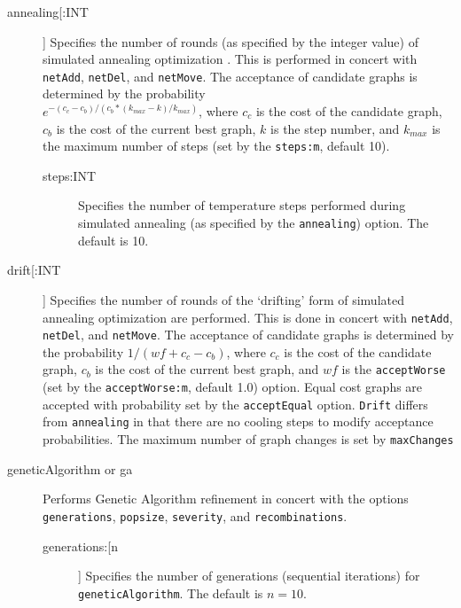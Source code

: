 	\begin{description}
		\item[annealing[:INT]] Specifies the number of rounds (as specified by the integer 
		value) of simulated annealing optimization \citep{Metropolisetal1953, 
		Kirkpatricketal1983, Cerny1985}. This is performed in concert with \texttt{netAdd}, 
		\texttt{netDel}, and \texttt{netMove}. The acceptance of candidate graphs is 
		determined by the probability\\ $e ^ {- (c_c - c_b)/ (c_b * (k_{max} -k)/ k_{max})}$, 
		where $c_c$ is the cost of the candidate graph, $c_b$ is the cost of the current 
		best graph, $k$ is the step number, and $k_{max}$ is the maximum number of 
		steps (set by the \texttt{steps:m}, default 10).

		\begin{description}
			\item[steps:INT] Specifies the number of temperature steps performed 
			during simulated annealing (as specified by the \texttt{annealing}) option.
			The default is 10.
		\end{description}
			
		\item[drift[:INT]] Specifies the number of rounds of the `drifting' form of simulated 
		annealing optimization \citep{goloboff1999} are performed. This is done in concert 
		with \texttt{netAdd}, \texttt{netDel}, and \texttt{netMove}. The acceptance of candidate 
		graphs is determined by the probability $1/ (wf + c_c - c_b)$, where $c_c$ is the cost 
		of the candidate graph, $c_b$ is the cost of the current best graph, and $wf$ is the 
		\texttt{acceptWorse} (set by the \texttt{acceptWorse:m}, default 1.0) option. Equal 
		cost graphs are accepted with probability set by the \texttt{acceptEqual} option. 
		\texttt{Drift} differs from \texttt{annealing} in that there are no cooling steps to modify 
		acceptance probabilities. The maximum number of graph changes is set by 
		\texttt{maxChanges}
				
		\item[geneticAlgorithm or ga] Performs Genetic Algorithm \citep{Holland1975} refinement in 
		concert with the options \texttt{generations}, \texttt{popsize}, \texttt{severity}, and 
		\texttt{recombinations}. 
			
			\begin{description}
			\item[generations:[n]] Specifies the number of generations (sequential iterations) for 
			\texttt{geneticAlgorithm}. The default is $n=10$.


\end{description}
\end{description}
